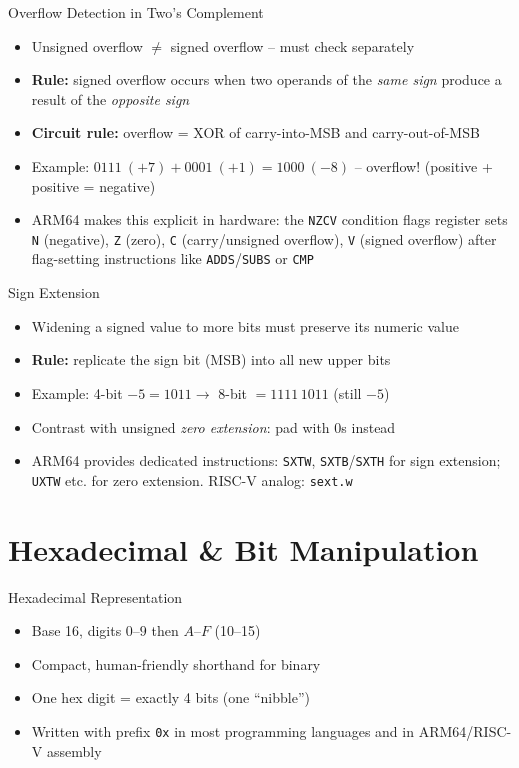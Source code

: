 \documentclass[10pt, aspectratio=169]{beamer}
\begin{document}
\begin{frame}{Overflow Detection in Two's Complement}
\begin{itemize}
    \item Unsigned overflow $\ne$ signed overflow -- must check separately
    \item \textbf{Rule:} signed overflow occurs when two operands of the \emph{same sign} produce a result of the \emph{opposite sign}
    \item \textbf{Circuit rule:} overflow = XOR of carry-into-MSB and carry-out-of-MSB
    \item Example: $0111\ (+7) + 0001\ (+1) = 1000\ (-8)$ -- overflow! (positive + positive = negative)
    \item ARM64 makes this explicit in hardware: the \texttt{NZCV} condition flags register sets \texttt{N} (negative), \texttt{Z} (zero), \texttt{C} (carry/unsigned overflow), \texttt{V} (signed overflow) after flag-setting instructions like \texttt{ADDS}/\texttt{SUBS} or \texttt{CMP}
\end{itemize}
\end{frame}

\begin{frame}{Sign Extension}
\begin{itemize}
    \item Widening a signed value to more bits must preserve its numeric value
    \item \textbf{Rule:} replicate the sign bit (MSB) into all new upper bits
    \item Example: 4-bit $-5 = 1011 \rightarrow$ 8-bit $= 1111\,1011$ (still $-5$)
    \item Contrast with unsigned \emph{zero extension}: pad with 0s instead
    \item ARM64 provides dedicated instructions: \texttt{SXTW}, \texttt{SXTB}/\texttt{SXTH} for sign extension; \texttt{UXTW} etc. for zero extension. RISC-V analog: \texttt{sext.w}
\end{itemize}
\end{frame}

\section{Hexadecimal \& Bit Manipulation}

\begin{frame}{Hexadecimal Representation}
\begin{itemize}
    \item Base 16, digits $0$--$9$ then $A$--$F$ (10--15)
    \item Compact, human-friendly shorthand for binary
    \item One hex digit = exactly 4 bits (one ``nibble'')
    \item Written with prefix \texttt{0x} in most programming languages and in ARM64/RISC-V assembly
\end{itemize}
\end{frame}
\end{document}
